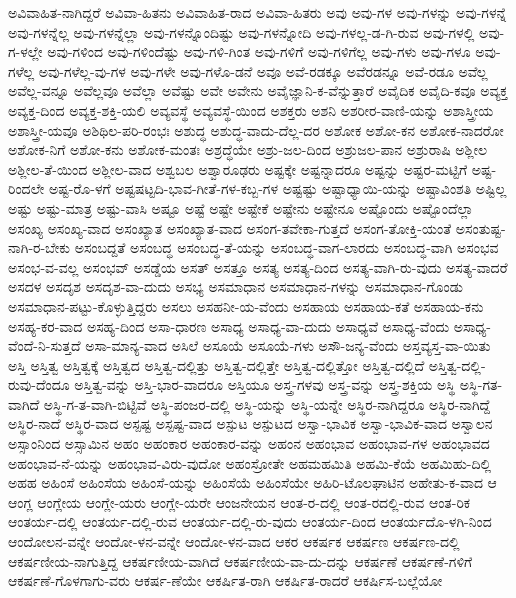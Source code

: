 {ಅವಿವಾಹಿತ-ನಾಗಿದ್ದರೆ
ಅವಿವಾ-ಹಿತನು
ಅವಿವಾಹಿತ-ರಾದ
ಅವಿವಾ-ಹಿತರು
ಅವು
ಅವು-ಗಳ
ಅವು-ಗಳನ್ನು
ಅವು-ಗಳನ್ನೆ
ಅವು-ಗಳನ್ನೆಲ್ಲ
ಅವು-ಗಳನ್ನೆಲ್ಲಾ
ಅವು-ಗಳನ್ನೊಂದಿಷ್ಟು
ಅವು-ಗಳನ್ನೋದಿ
ಅವು-ಗಳಲ್ಲ-ಡ-ಗಿ-ರುವ
ಅವು-ಗಳಲ್ಲಿ
ಅವು-ಗ-ಳಲ್ಲೇ
ಅವು-ಗಳಿಂದ
ಅವು-ಗಳಿಂದೆಷ್ಟು
ಅವು-ಗಳಿ-ಗಿಂತ
ಅವು-ಗಳಿಗೆ
ಅವು-ಗಳಿಗೆಲ್ಲ
ಅವು-ಗಳು
ಅವು-ಗಳೂ
ಅವು-ಗಳೆಲ್ಲ
ಅವು-ಗಳೆಲ್ಲ-ವು-ಗಳ
ಅವು-ಗಳೇ
ಅವು-ಗಳೊ-ಡನೆ
ಅವೂ
ಅವೆ-ರಡಕ್ಕೂ
ಅವೆರಡನ್ನೂ
ಅವೆ-ರಡೂ
ಅವೆಲ್ಲ
ಅವೆಲ್ಲ-ವನ್ನೂ
ಅವೆಲ್ಲವೂ
ಅವೆಲ್ಲಾ
ಅವೆಷ್ಟು
ಅವೇ
ಅವೇನು
ಅವೈಜ್ಞಾನಿ-ಕ-ವೆನ್ನುತ್ತಾರೆ
ಅವೈದಿಕ
ಅವೈದಿ-ಕವೂ
ಅವ್ಯಕ್ತ
ಅವ್ಯಕ್ತ-ದಿಂದ
ಅವ್ಯಕ್ತ-ಶಕ್ತಿ-ಯಲಿ
ಅವ್ಯವಸ್ಥೆ
ಅವ್ಯವಸ್ಥೆ-ಯಿಂದ
ಅಶಕ್ತರು
ಅಶನಿ
ಅಶರೀರ-ವಾಣಿ-ಯನ್ನು
ಅಶಾಸ್ತ್ರೀಯ
ಅಶಾಸ್ತ್ರೀ-ಯವೂ
ಅಶಿಥಿಲ-ಪರಿ-ರಂಭಃ
ಅಶುದ್ಧ
ಅಶುದ್ಧ-ವಾದು-ದೆಲ್ಲ-ದರ
ಅಶೋಕ
ಅಶೋ-ಕನ
ಅಶೋಕ-ನಾದರೋ
ಅಶೋಕ-ನಿಗೆ
ಅಶೋ-ಕನು
ಅಶೋಕ-ಮಂತಃ
ಅಶ್ರದ್ಧೆಯೇ
ಅಶ್ರು-ಜಲ-ದಿಂದ
ಅಶ್ರುಜಲ-ಪಾನ
ಅಶ್ರುರಾಷಿ
ಅಶ್ಲೀಲ
ಅಶ್ಲೀಲ-ತೆ-ಯಿಂದ
ಅಶ್ಲೀಲ-ವಾದ
ಅಶ್ವಬಲ
ಅಶ್ವಾರೂಢರು
ಅಷ್ಟಕ್ಕೇ
ಅಷ್ಟನ್ನಾದರೂ
ಅಷ್ಟನ್ನು
ಅಷ್ಟರ-ಮಟ್ಟಿಗೆ
ಅಷ್ಟ-ರಿಂದಲೇ
ಅಷ್ಟ-ರೊ-ಳಗೆ
ಅಷ್ಟಷಟ್ಟದಿ-ಭಾವ-ಗೀತೆ-ಗಳ-ಕಬ್ಬ-ಗಳ
ಅಷ್ಟಷ್ಟು
ಅಷ್ಟಾಧ್ಯಾಯಿ-ಯನ್ನು
ಅಷ್ಟಾವಿಂಶತಿ
ಅಷ್ಟಿಲ್ಲ
ಅಷ್ಟು
ಅಷ್ಟು-ಮಾತ್ರ
ಅಷ್ಟು-ವಾಸಿ
ಅಷ್ಟೂ
ಅಷ್ಟೆ
ಅಷ್ಟೇ
ಅಷ್ಟೇಕೆ
ಅಷ್ಟೇನು
ಅಷ್ಟೇನೂ
ಅಷ್ಟೊಂದು
ಅಷ್ಟೊಂದೆಲ್ಲಾ
ಅಸಂಖ್ಯ
ಅಸಂಖ್ಯ-ವಾದ
ಅಸಂಖ್ಯಾತ
ಅಸಂಖ್ಯಾತ-ವಾದ
ಅಸಂಗ-ತವೇಕಾ-ಗುತ್ತದೆ
ಅಸಂಗ-ತೋಕ್ತಿ-ಯಂತೆ
ಅಸಂತುಷ್ಟ-ನಾಗಿ-ರ-ಬೇಕು
ಅಸಂಬದ್ದತೆ
ಅಸಂಬದ್ಧ
ಅಸಂಬದ್ಧ-ತೆ-ಯನ್ನು
ಅಸಂಬದ್ಧ-ವಾಗ-ಲಾರದು
ಅಸಂಬದ್ಧ-ವಾಗಿ
ಅಸಂಭವ
ಅಸಂಭ-ವ-ವಲ್ಲ
ಅಸಂಭವ್
ಅಸಡ್ಡೆಯ
ಅಸತ್
ಅಸತ್ತೂ
ಅಸತ್ಯ
ಅಸತ್ಯ-ದಿಂದ
ಅಸತ್ಯ-ವಾಗಿ-ರು-ವುದು
ಅಸತ್ಯ-ವಾದರೆ
ಅಸದಳ
ಅಸದೃಶ
ಅಸದೃಶ-ವಾ-ದುದು
ಅಸಭ್ಯ
ಅಸಮಾಧಾನ
ಅಸಮಾಧಾನ-ಗಳನ್ನು
ಅಸಮಾಧಾನ-ಗೊಂಡು
ಅಸಮಾಧಾನ-ಪಟ್ಟು-ಕೊಳ್ಳುತ್ತಿದ್ದರು
ಅಸಲು
ಅಸಹನೀ-ಯ-ವೆಂದು
ಅಸಹಾಯ
ಅಸಹಾಯ-ಕತೆ
ಅಸಹಾಯ-ಕನು
ಅಸಹ್ಯ-ಕರ-ವಾದ
ಅಸಹ್ಯ-ದಿಂದ
ಅಸಾ-ಧಾರಣ
ಅಸಾಧ್ಯ
ಅಸಾಧ್ಯ-ವಾ-ದುದು
ಅಸಾಧ್ಯವೆ
ಅಸಾಧ್ಯ-ವೆಂದು
ಅಸಾಧ್ಯ-ವೆಂದೆ-ನಿ-ಸುತ್ತದೆ
ಅಸಾ-ಮಾನ್ಯ-ವಾದ
ಅಸಿಲೆ
ಅಸೂಯೆ
ಅಸೂಯೆ-ಗಳು
ಅಸೌ-ಜನ್ಯ-ವೆಂದು
ಅಸ್ತವ್ಯಸ್ತ-ವಾ-ಯಿತು
ಅಸ್ತಿ
ಅಸ್ತಿತ್ವ
ಅಸ್ತಿತ್ವಕ್ಕೆ
ಅಸ್ತಿತ್ವದ
ಅಸ್ತಿತ್ವ-ದಲ್ಲಿತ್ತು
ಅಸ್ತಿತ್ವ-ದಲ್ಲಿತ್ತೇ
ಅಸ್ತಿತ್ವ-ದಲ್ಲಿತ್ತೋ
ಅಸ್ತಿತ್ವ-ದಲ್ಲಿದೆ
ಅಸ್ತಿತ್ವ-ದಲ್ಲಿ-ರುವು-ದೆಂದೂ
ಅಸ್ತಿತ್ವ-ವನ್ನು
ಅಸ್ತಿ-ಭಾರ-ವಾದರೂ
ಅಸ್ತಿಯೂ
ಅಸ್ತ್ರ-ಗಳವು
ಅಸ್ತ್ರ-ವನ್ನು
ಅಸ್ತ್ರ-ಶಕ್ತಿಯ
ಅಸ್ಥಿ
ಅಸ್ಥಿ-ಗತ-ವಾಗಿದೆ
ಅಸ್ಥಿ-ಗ-ತ-ವಾಗಿ-ಬಿಟ್ಟಿವೆ
ಅಸ್ಥಿ-ಪಂಜರ-ದಲ್ಲಿ
ಅಸ್ಥಿ-ಯನ್ನು
ಅಸ್ಥಿ-ಯನ್ನೇ
ಅಸ್ಥಿರ-ನಾಗಿದ್ದರೂ
ಅಸ್ಥಿರ-ನಾಗಿದ್ದೆ
ಅಸ್ಥಿರ-ನಾದೆ
ಅಸ್ಥಿರ-ವಾದ
ಅಸ್ಪಷ್ಟ
ಅಸ್ಪಷ್ಟ-ವಾದ
ಅಸ್ಪುಟ
ಅಸ್ಪುಟದ
ಅಸ್ವಾ-ಭಾವಿಕ
ಅಸ್ವಾ-ಭಾವಿಕ-ವಾದ
ಅಸ್ವಾಲನ
ಅಸ್ಸಾಂನಿಂದ
ಅಸ್ಸಾಮಿನ
ಅಹಂ
ಅಹಂಕಾರ
ಅಹಂಕಾರ-ವನ್ನು
ಅಹಂನ
ಅಹಂಭಾವ
ಅಹಂಭಾವ-ಗಳ
ಅಹಂಭಾವದ
ಅಹಂಭಾವ-ನೆ-ಯನ್ನು
ಅಹಂಭಾವ-ವಿರು-ವುದೋ
ಅಹಂಸ್ರೋತೇ
ಅಹಮಹಮಿತಿ
ಅಹಮಿ-ಕೆಯೆ
ಅಹಮಿಹು-ದಿಲ್ಲಿ
ಅಹಹ
ಅಹಿಂಸೆ
ಅಹಿಂಸೆಯ
ಅಹಿಂಸೆ-ಯನ್ನು
ಅಹಿಂಸೆಯೆ
ಅಹಿಂಸೆಯೇ
ಅಹಿರಿ-ಟೊಲಘಾಟಿನ
ಅಹೇತು-ಕ-ವಾದ
ಆ
ಆಂಗ್ಲ
ಆಂಗ್ಲೇಯ
ಆಂಗ್ಲೇ-ಯರು
ಆಂಗ್ಲೇ-ಯರೇ
ಆಂಜನೇಯನ
ಆಂತ-ರ-ದಲ್ಲಿ
ಆಂತ-ರದಲ್ಲಿ-ರುವ
ಆಂತ-ರಿಕ
ಆಂತರ್ಯ-ದಲ್ಲಿ
ಆಂತರ್ಯ-ದಲ್ಲಿ-ರುವ
ಆಂತರ್ಯ-ದಲ್ಲಿ-ರು-ವುದು
ಆಂತರ್ಯ-ದಿಂದ
ಆಂತರ್ಯದೊ-ಳಗಿ-ನಿಂದ
ಆಂದೋಲನ-ವನ್ನೇ
ಆಂದೋ-ಳನ-ವನ್ನೇ
ಆಂದೋ-ಳನ-ವಾದ
ಆಕರ
ಆಕರ್ಷಕ
ಆಕರ್ಷಣ
ಆಕರ್ಷಣ-ದಲ್ಲಿ
ಆಕರ್ಷಣೀಯ-ನಾಗುತ್ತಿದ್ದ
ಆಕರ್ಷಣೀಯ-ವಾಗಿದೆ
ಆಕರ್ಷಣೀಯ-ವಾ-ದು-ದನ್ನು
ಆಕರ್ಷಣೆ
ಆಕರ್ಷಣೆ-ಗಳಿಗೆ
ಆಕರ್ಷಣೆ-ಗೊಳಗಾಗು-ವರು
ಆಕರ್ಷ-ಣೆಯೇ
ಆಕರ್ಷಿತ-ರಾಗಿ
ಆಕರ್ಷಿತ-ರಾದರೆ
ಆಕರ್ಷಿಸ-ಬಲ್ಲೆಯೋ
}
